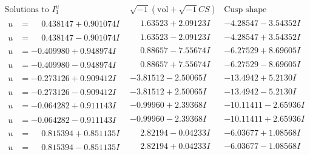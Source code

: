 \documentclass[1p]{elsarticle_modified}
\theoremstyle{definition}
\newcommand{\I}{\sqrt{-1}}
\begin{document}
$$\begin{array}{c|c|c}  
\text{Solutions to }I^u_{1}& \I (\text{vol} + \sqrt{-1}CS) & \text{Cusp shape}\\
 \hline 
\begin{aligned}
u &= \phantom{-}0.438147 + 0.901074 I\end{aligned}
 & \phantom{-}1.63523 + 2.09123 I & -4.28547 - 3.54352 I \\ \hline\begin{aligned}
u &= \phantom{-}0.438147 - 0.901074 I\end{aligned}
 & \phantom{-}1.63523 - 2.09123 I & -4.28547 + 3.54352 I \\ \hline\begin{aligned}
u &= -0.409980 + 0.948974 I\end{aligned}
 & \phantom{-}0.88657 - 7.55674 I & -6.27529 + 8.69605 I \\ \hline\begin{aligned}
u &= -0.409980 - 0.948974 I\end{aligned}
 & \phantom{-}0.88657 + 7.55674 I & -6.27529 - 8.69605 I \\ \hline\begin{aligned}
u &= -0.273126 + 0.909412 I\end{aligned}
 & -3.81512 - 2.50065 I & -13.4942 + 5.2130 I \\ \hline\begin{aligned}
u &= -0.273126 - 0.909412 I\end{aligned}
 & -3.81512 + 2.50065 I & -13.4942 - 5.2130 I \\ \hline\begin{aligned}
u &= -0.064282 + 0.911143 I\end{aligned}
 & -0.99960 + 2.39368 I & -10.11411 - 2.65936 I \\ \hline\begin{aligned}
u &= -0.064282 - 0.911143 I\end{aligned}
 & -0.99960 - 2.39368 I & -10.11411 + 2.65936 I \\ \hline\begin{aligned}
u &= \phantom{-}0.815394 + 0.851135 I\end{aligned}
 & \phantom{-}2.82194 - 0.04233 I & -6.03677 + 1.08568 I \\ \hline\begin{aligned}
u &= \phantom{-}0.815394 - 0.851135 I\end{aligned}
 & \phantom{-}2.82194 + 0.04233 I & -6.03677 - 1.08568 I \\ \hline\begin{aligned}

\end{aligned}
\end{array}$$
\end{document}
